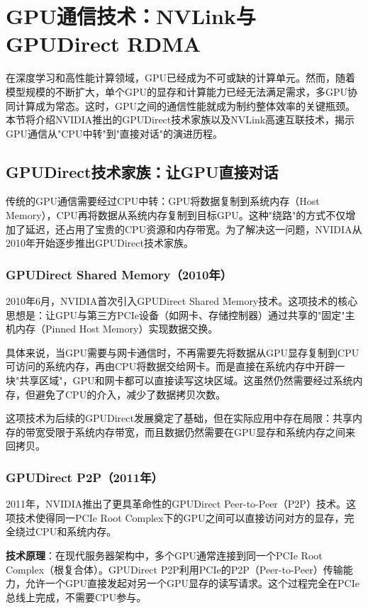 \section{GPU通信技术：NVLink与GPUDirect RDMA}

在深度学习和高性能计算领域，GPU已经成为不可或缺的计算单元。然而，随着模型规模的不断扩大，单个GPU的显存和计算能力已经无法满足需求，多GPU协同计算成为常态。这时，GPU之间的通信性能就成为制约整体效率的关键瓶颈。本节将介绍NVIDIA推出的GPUDirect技术家族以及NVLink高速互联技术，揭示GPU通信从"CPU中转"到"直接对话"的演进历程。

\subsection{GPUDirect技术家族：让GPU直接对话}

传统的GPU通信需要经过CPU中转：GPU将数据复制到系统内存（Host Memory），CPU再将数据从系统内存复制到目标GPU。这种"绕路"的方式不仅增加了延迟，还占用了宝贵的CPU资源和内存带宽。为了解决这一问题，NVIDIA从2010年开始逐步推出GPUDirect技术家族。

\subsubsection{GPUDirect Shared Memory（2010年）}

2010年6月，NVIDIA首次引入GPUDirect Shared Memory技术。这项技术的核心思想是：让GPU与第三方PCIe设备（如网卡、存储控制器）通过共享的"固定"主机内存（Pinned Host Memory）实现数据交换。

具体来说，当GPU需要与网卡通信时，不再需要先将数据从GPU显存复制到CPU可访问的系统内存，再由CPU将数据交给网卡。而是直接在系统内存中开辟一块"共享区域"，GPU和网卡都可以直接读写这块区域。这虽然仍然需要经过系统内存，但避免了CPU的介入，减少了数据拷贝次数。

这项技术为后续的GPUDirect发展奠定了基础，但在实际应用中存在局限：共享内存的带宽受限于系统内存带宽，而且数据仍然需要在GPU显存和系统内存之间来回拷贝。

\subsubsection{GPUDirect P2P（2011年）}

2011年，NVIDIA推出了更具革命性的GPUDirect Peer-to-Peer（P2P）技术。这项技术使得同一PCIe Root Complex下的GPU之间可以直接访问对方的显存，完全绕过CPU和系统内存。

\textbf{技术原理}：在现代服务器架构中，多个GPU通常连接到同一个PCIe Root Complex（根复合体）。GPUDirect P2P利用PCIe的P2P（Peer-to-Peer）传输能力，允许一个GPU直接发起对另一个GPU显存的读写请求。这个过程完全在PCIe总线上完成，不需要CPU参与。

